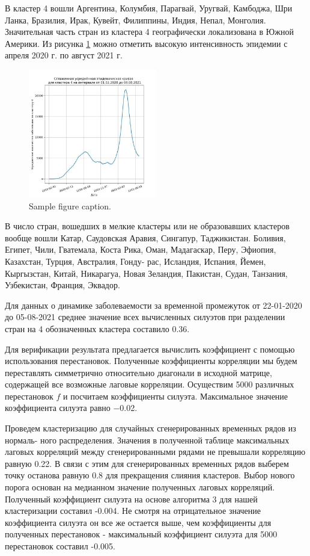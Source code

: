 \documentclass{article}
\begin{document}
В кластер 4 вошли Аргентина, Колумбия, Парагвай, Уругвай, Камбоджа, Шри Ланка, Бразилия, Ирак, Кувейт, Филиппины, Индия, Непал, Монголия. Значительная часть стран из кластера 4 географически локализована в Южной Америки. Из рисунка \ref{fig:fig4} можно отметить высокую интенсивность эпидемии с апреля 2020 г. по август 2021 г.

\begin{figure}
	\centering
	\includegraphics[width=0.5\textwidth]{../figures/clasters4.jpg}
	\caption{Sample figure caption.}
	\label{fig:fig4}
\end{figure}

В число стран, вошедших в мелкие кластеры или не образовавших кластеров вообще вошли Катар, Саудовская Аравия, Сингапур, Таджикистан. Боливия, Египет, Чили, Гватемала, Коста Рика, Оман, Мадагаскар, Перу, Эфиопия, Казахстан, Турция, Австралия, Гонду-
рас, Исландия, Испания, Йемен, Кыргызстан, Китай, Никарагуа, Новая Зеландия, Пакистан, Судан, Танзания, Узбекистан, Франция, Эквадор.

Для данных о динамике заболеваемости за временной промежуток от 22-01-2020 до 05-08-2021 среднее значение всех вычисленных силуэтов при разделении стран на 4 обозначенных
кластера составило 0.36.

Для верификации результата предлагается вычислить коэффициент с помощью использования перестановок. Полученные коэффициенты корреляции мы будем переставлять симметрично относительно диагонали в исходной матрице, содержащей все возможные лаговые корреляции. Осуществим 5000 различных перестановок $f$ и посчитаем коэффициенты силуэта. Максимальное значение коэффициента силуэта равно −0.02.

Проведем кластеризацию для случайных сгенерированных временных рядов из нормаль-
ного распределения. Значения в полученной таблице максимальных лаговых корреляций между сгенерированными рядами не превышали корреляцию равную 0.22. В связи с этим для сгенерированных временных рядов выберем точку останова равную 0.8 для прекращения слияния кластеров. Выбор нового порога основан на медианном значение полученных лаговых корреляций. Полученный коэффициент силуэта на основе алгоритма 3 для нашей кластеризации составил -0.004. Не смотря на отрицательное значение коэффициента силуэта он все же остается выше, чем коэффициенты для полученных перестановок - максимальный коэффициент силуэта для 5000 перестановок составил -0.005.
\end{document}
